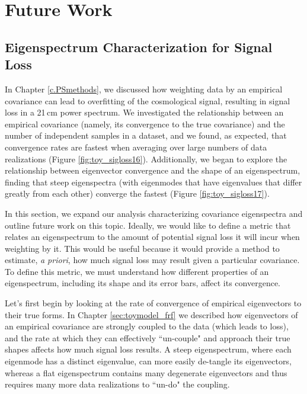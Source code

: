 \chapter{Future Work}
\label{c.future}

\section{Eigenspectrum Characterization for Signal Loss}

In Chapter \ref{c.PSmethods}, we discussed how weighting data by an empirical covariance can lead to overfitting of the cosmological signal, resulting in signal loss in a 21\,cm power spectrum. We investigated the relationship between an empirical covariance (namely, its convergence to the true covariance) and the number of independent samples in a dataset, and we found, as expected, that convergence rates are fastest when averaging over large numbers of data realizations (Figure \ref{fig:toy_sigloss16}). Additionally, we began to explore the relationship between eigenvector convergence and the shape of an eigenspectrum, finding that steep eigenspectra (with eigenmodes that have eigenvalues that differ greatly from each other) converge the fastest (Figure \ref{fig:toy_sigloss17}).

In this section, we expand our analysis characterizing covariance eigenspectra and outline future work on this topic. Ideally, we would like to define a metric that relates an eigenspectrum to the amount of potential signal loss it will incur when weighting by it. This would be useful because it would provide a method to estimate, \textit{a priori}, how much signal loss may result given a particular covariance. To define this metric, we must understand how different properties of an eigenspectrum, including its shape and its error bars, affect its convergence. 

Let's first begin by looking at the rate of convergence of empirical eigenvectors to their true forms. In Chapter \ref{sec:toymodel_frf} we described how eigenvectors of an empirical covariance are strongly coupled to the data (which leads to loss), and the rate at which they can effectively ``un-couple" and approach their true shapes affects how much signal loss results. A steep eigenspectrum, where each eigenmode has a distinct eigenvalue, can more easily de-tangle its eigenvectors, whereas a flat eigenspectrum contains many degenerate eigenvectors and thus requires many more data realizations to ``un-do" the coupling. 


